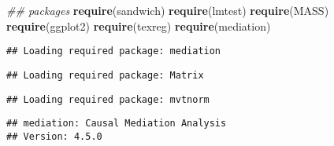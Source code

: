 \documentclass[
]{article}
\newenvironment{Shaded}{\begin{snugshade}}{\end{snugshade}}
\newcommand{\CommentTok}[1]{\textcolor[rgb]{0.56,0.35,0.01}{\textit{#1}}}
\newcommand{\KeywordTok}[1]{\textcolor[rgb]{0.13,0.29,0.53}{\textbf{#1}}}
\newcommand{\NormalTok}[1]{#1}
\begin{document}
\begin{Shaded}
\begin{Highlighting}[]
\CommentTok{## packages}
\KeywordTok{require}\NormalTok{(sandwich)}
\KeywordTok{require}\NormalTok{(lmtest)}
\KeywordTok{require}\NormalTok{(MASS)}
\KeywordTok{require}\NormalTok{(ggplot2)}
\KeywordTok{require}\NormalTok{(texreg)}
\KeywordTok{require}\NormalTok{(mediation)}
\end{Highlighting}
\end{Shaded}

\begin{verbatim}
## Loading required package: mediation
\end{verbatim}

\begin{verbatim}
## Loading required package: Matrix
\end{verbatim}

\begin{verbatim}
## Loading required package: mvtnorm
\end{verbatim}

\begin{verbatim}
## mediation: Causal Mediation Analysis
## Version: 4.5.0
\end{verbatim}
\end{document}
